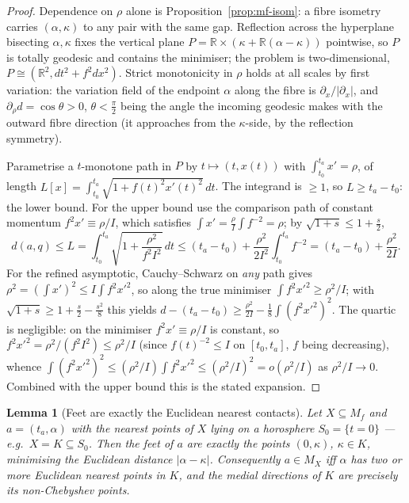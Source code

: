 \documentclass[11pt]{article}
\newtheorem{lemma}[theorem]{Lemma}
\theoremstyle{remark}
\newcommand{\R}{\mathbb{R}}
\newcommand{\X}{X}
\newcommand{\Mx}{M_{\X}}
\newcommand{\Sb}[1]{S_{#1}}
\newcommand{\Mf}{M_{f}}
\begin{document}
\begin{proof}
Dependence on $\rho$ alone is Proposition~\ref{prop:mf-isom}: a fibre
isometry carries $(\alpha,\kappa)$ to any pair with the same gap.
Reflection across the hyperplane bisecting $\alpha,\kappa$ fixes the
vertical plane $P=\R\times(\kappa+\R(\alpha-\kappa))$ pointwise, so $P$
is totally geodesic and contains the minimiser; the problem is
two-dimensional, $P\cong(\R^{2},dt^{2}+f^{2}dx^{2})$. Strict
monotonicity in $\rho$ holds at all scales by first variation: the
variation field of the endpoint $\alpha$ along the fibre is
$\partial_{x}/|\partial_{x}|$, and $\partial_{\rho}d=\cos\theta>0$,
$\theta<\tfrac{\pi}{2}$ being the angle the incoming geodesic makes
with the outward fibre direction (it approaches from the $\kappa$-side,
by the reflection symmetry).

Parametrise a $t$-monotone path in $P$ by $t\mapsto(t,x(t))$ with
$\int_{t_{0}}^{t_{a}}x'=\rho$, of length
$L[x]=\int_{t_{0}}^{t_{a}}\sqrt{1+f(t)^{2}x'(t)^{2}}\,dt$. The
integrand is $\ge1$, so $L\ge t_{a}-t_{0}$: the lower bound. For the
upper bound use the comparison path of constant momentum
$f^{2}x'\equiv\rho/I$, which satisfies
$\int x'=\frac{\rho}{I}\int f^{-2}=\rho$; by
$\sqrt{1+s}\le1+\tfrac{s}{2}$,
\[
  d(a,q)\le L=\int_{t_{0}}^{t_{a}}\sqrt{1+\frac{\rho^{2}}{f^{2}I^{2}}}
  \,dt\le(t_{a}-t_{0})+\frac{\rho^{2}}{2I^{2}}\int_{t_{0}}^{t_{a}}f^{-2}
  =(t_{a}-t_{0})+\frac{\rho^{2}}{2I}.
\]
For the refined asymptotic, Cauchy--Schwarz on \emph{any} path gives
$\rho^{2}=(\int x')^{2}\le I\int f^{2}x'^{2}$, so along the true
minimiser $\int f^{2}x'^{2}\ge\rho^{2}/I$; with
$\sqrt{1+s}\ge1+\tfrac{s}{2}-\tfrac{s^{2}}{8}$ this yields
$d-(t_{a}-t_{0})\ge\tfrac{\rho^{2}}{2I}-\tfrac18\int(f^{2}x'^{2})^{2}$.
The quartic is negligible: on the minimiser $f^{2}x'\equiv\rho/I$ is
constant, so $f^{2}x'^{2}=\rho^{2}/(f^{2}I^{2})\le\rho^{2}/I$ (since
$f(t)^{-2}\le I$ on $[t_{0},t_{a}]$, $f$ being decreasing), whence
$\int(f^{2}x'^{2})^{2}\le(\rho^{2}/I)\int f^{2}x'^{2}\le(\rho^{2}/I)^{2}
=o(\rho^{2}/I)$ as $\rho^{2}/I\to0$. Combined with the upper bound this
is the stated expansion.
\end{proof}

\begin{lemma}[Feet are exactly the Euclidean nearest contacts]
\label{lem:feet}
Let $\X\subseteq\Mf$ and $a=(t_{a},\alpha)$ with the nearest points of
$\X$ lying on a horosphere $\Sb{0}=\{t=0\}$ --- e.g.\ $\X=K\subseteq
\Sb{0}$. Then the feet of $a$ are exactly the points $(0,\kappa)$,
$\kappa\in K$, minimising the Euclidean distance $|\alpha-\kappa|$.
Consequently $a\in\Mx$ iff $\alpha$ has two or more Euclidean nearest
points in $K$, and the medial directions of $K$ are precisely its
non-Chebyshev points.
\end{lemma}
\end{document}
